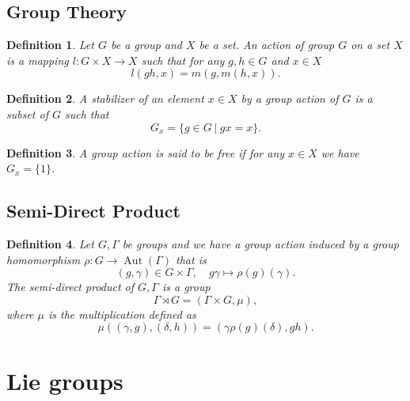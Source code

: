 \documentclass{article}
\newtheorem{definition}{Definition}[section]
\numberwithin{equation}{section}
\DeclareMathOperator{\Aut}{Aut}
\begin{document}
\subsection{Group Theory}

\begin{definition}
Let $G$ be a group and $X$ be a set. An action of group $G$ on a set $X$ is a mapping $l:G\times X\to X$ such that for any $g,h\in G$ and $x\in X$
\begin{equation*}
l(gh,x) = m(g,m(h,x)).
\end{equation*}
\end{definition}

\begin{definition}
A stabilizer of an element $x\in X$ by a group action of $G$ is a subset of $G$ such that
\begin{equation*}
G_x=\{g\in G\:|\: gx=x\}.
\end{equation*}
\end{definition}

\begin{definition}
A group action is said to be free if for any $x\in X$ we have $G_x=\{1\}$.
\end{definition}

\subsection{Semi-Direct Product}

\begin{definition}
Let $G,\Gamma$ be groups and we have a group action induced by a group homomorphism $\rho:G\to\Aut(\Gamma)$ that is 
\begin{equation*}
(g,\gamma)\in G\times\Gamma,\quad g\gamma\mapsto \rho(g)(\gamma).
\end{equation*}
The semi-direct product of $G,\Gamma$ is a group
\begin{equation*}
\Gamma\rtimes G=( \Gamma\times G, \mu),
\end{equation*}
where $\mu$ is the multiplication defined as
\begin{equation*}
\mu((\gamma,g),(\delta,h)) = (\gamma\rho(g)(\delta),gh).
\end{equation*}
\end{definition}

\section{Lie groups}
\end{document}
